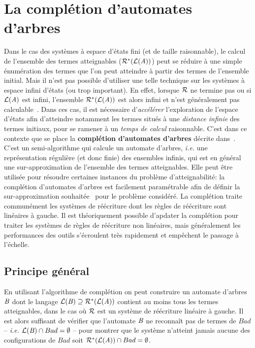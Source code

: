\section{La complétion d'automates d'arbres}
\label{sec:completion}
Dans le cas des systèmes à espace d'états fini (et de taille
raisonnable), le calcul de l'ensemble des termes atteignables
($\mathcal R^*(\mathcal{L}(\mathit A))$) peut se réduire à une simple énumération des
termes que l'on peut atteindre à partir des termes de l'ensemble
initial.  Mais il n'est pas possible d'utiliser une telle
technique sur les systèmes à espace infini d'états (ou trop
important). En effet, lorsque $\mathcal R$ ne termine pas ou si 
$\mathcal{L}(\mathit A)$ est infini, l'ensemble $\mathcal R^*(\mathcal{L}(\mathit A))$ est
alors infini et n'est généralement pas calculable~\cite{GilleronTison-FI95}.
Dans ces cas, il est nécessaire d'\textit{accélérer} l'exploration de
l'espace d'états afin d'atteindre notamment les termes situés à une
\textit{distance infinie} des termes initiaux, pour se ramener à un 
\textit{temps de calcul} raisonnable.
C'est dans ce contexte que se place la \textbf{complétion d'automates d'arbres}
décrite dans~\cite{Genet-RTA98,FeuilladeGVTT-JAR04}.
C'est un semi-algorithme qui calcule un automate d'arbres, \textit{i.e.} une représentation
régulière (et donc finie) des ensembles infinis, qui est en général
une sur-approximation de l'ensemble des termes atteignables.
Elle peut être utilisée pour résoudre certaines instances du problème d'atteignabilité:
la complétion d'automates d'arbres est facilement paramétrable afin de définir 
la sur-approximation souhaitée~\cite{Genet-RTA98,FeuilladeGVTT-JAR04,Takai-RTA04}
pour le problème considéré. La complétion traite communément les systèmes de 
réécriture dont les règles de réécriture sont linéaires à gauche. Il est 
théoriquement possible d'apdater la complétion pour traiter les systèmes 
de règles de réécriture non linéaires, mais généralement les performances
des outils s'écroulent très rapidement et empêchent le passage à l'échelle.

\subsection{Principe général}

En utilisant l'algorithme de complétion on peut construire un
automate d'arbres $\mathit B$ dont le langage $\mathcal{L}(\mathit B) \supseteq
\mathcal R^*(\mathcal{L}(\mathit A))$ contient au moins tous les termes atteignables, dans le cas
où $\mathcal R$ est un système de réécriture linéaire à gauche.  Il
est alors suffisant de vérifier que l'automate $\mathit B$ ne reconnaît pas
de termes de $Bad$ -- \textit{i.e.} $\mathcal{L}(\mathit B)\cap Bad = \emptyset$ --
pour montrer que le système n'atteint jamais aucune des configurations
de $Bad$ soit $\mathcal R^*(\mathcal{L}(\mathit A))\cap Bad=\emptyset$.


